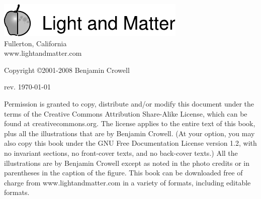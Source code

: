\thispagestyle{empty}

\vspace{100mm}

\noindent
\includegraphics{ch00/figs/lmlogo}\\
Fullerton, California\\
www.lightandmatter.com

\vspace{20mm}
\noindent
Copyright \copyright  2001-2008 Benjamin Crowell

\vspace{20mm}
\noindent
rev. \today{}

\vspace{6mm}
\noindent
Permission is granted to copy, distribute and/or modify this
document under the terms of the Creative Commons Attribution
Share-Alike License, which can be found at creativecommons.org. The license
applies to the entire text of this book, plus all the illustrations
that are by Benjamin Crowell. (At your option, you may also copy this book
under the GNU Free Documentation License version 1.2, with no invariant
sections, no front-cover texts, and no back-cover texts.) All the illustrations are by Benjamin
Crowell except as noted in the photo credits or in parentheses
in the caption of the figure.
This book can be downloaded free of charge
from www.lightandmatter.com in a variety of formats,
including editable formats.
